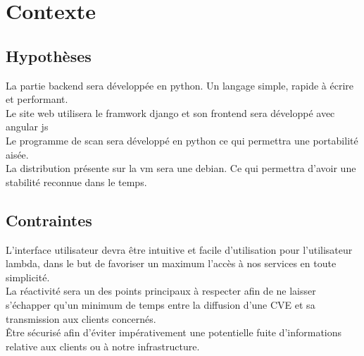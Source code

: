 \chapter{Contexte}
\section{Hypothèses}
La partie backend sera développée en python. Un langage simple, rapide à écrire et performant.\\
Le site web utilisera le framwork django et son frontend sera développé avec angular js\\
Le programme de scan sera développé en python ce qui permettra une portabilité aisée.\\
La distribution présente sur la vm sera une debian. Ce qui permettra d’avoir une stabilité reconnue dans le temps.\\

\section{Contraintes}
L’interface utilisateur devra être intuitive et facile d’utilisation pour l’utilisateur lambda, dans le but de favoriser un maximum l’accès à nos services en toute simplicité.\\
La réactivité sera un des points principaux à respecter afin de ne laisser s’échapper qu’un minimum de temps entre la diffusion d’une CVE et sa transmission aux clients concernés.\\
Être sécurisé afin d’éviter impérativement une potentielle fuite d’informations relative aux clients ou à notre infrastructure.\\
